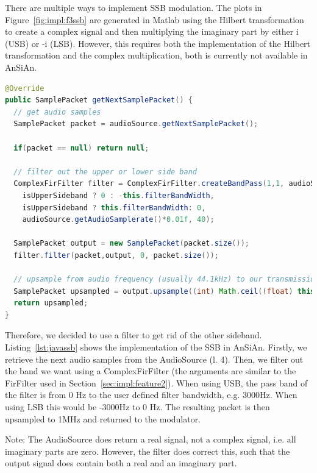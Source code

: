 There are multiple ways to implement SSB modulation. The plots in Figure~\ref{fig:impl:f3ssb} are generated in Matlab using the Hilbert transformation to create a complex signal and then multiplying the imaginary part by either i (USB) or -i (LSB). However, this requires both the implementation of the Hilbert transformation and the complex multiplication, both is currently not available in AnSiAn. 

\begin{lstlisting}[label=lst:javassb, caption=Modulating microphone samples using SSB, language=java,]
@Override
public SamplePacket getNextSamplePacket() {
  // get audio samples
  SamplePacket packet = audioSource.getNextSamplePacket();
	
  if(packet == null) return null;
	
  // filter out the upper or lower side band
  ComplexFirFilter filter = ComplexFirFilter.createBandPass(1,1, audioSource.getAudioSamplerate(),
	isUpperSideband ? 0 : -this.filterBandWidth,
	isUpperSideband ? this.filterBandWidth: 0,
	audioSource.getAudioSamplerate()*0.01f, 40);
	
  SamplePacket output = new SamplePacket(packet.size());
  filter.filter(packet,output, 0, packet.size());
	
  // upsample from audio frequency (usually 44.1kHz) to our transmission frequency (1MHz)
  SamplePacket upsampled = output.upsample((int) Math.ceil((float) this.sampleRate / audioSource.getAudioSamplerate()));
  return upsampled;
}
\end{lstlisting}


Therefore, we decided to use a filter to get rid of the other sideband. Listing~\ref{lst:javassb} shows the implementation of the SSB in AnSiAn. Firstly, we retrieve the next audio samples from the AudioSource (l. 4). Then, we filter out the band we want using a ComplexFirFilter (the arguments are similar to the FirFilter used in Section~\ref{sec:impl:feature2}). When using USB, the pass band of the filter is from 0 Hz to the user defined filter bandwidth, e.g. 3000Hz. When using LSB this would be -3000Hz to 0 Hz. The resulting packet is then upsampled to 1MHz and returned to the modulator. 

Note: The AudioSource does return a real signal, not a complex signal, i.e. all imaginary parts are zero. However, the filter does correct this, such that the output signal does contain both a real and an imaginary part.

\newpage
